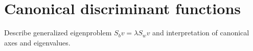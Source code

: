 \section{Canonical discriminant functions}

Describe generalized eigenproblem $S_b v = \lambda S_w v$ and interpretation of canonical axes and eigenvalues.
